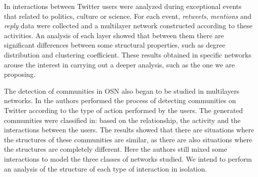 
In \cite{Omodei2015} interactions between Twitter users were analyzed during exceptional events that related to politics, culture or science. For each event, \emph{retweets}, \emph{mentions} and \emph{reply} data were collected and a multilayer network constructed according to these activities. An analysis of each layer showed that between them there are significant differences between some structural properties, such as degree distribution and clustering coefficient. These results obtained in specific networks arouse the interest in carrying out a deeper analysis, such as the one we are proposing.

The detection of communities in OSN also began to be studied in multilayers networks. In \cite{Darmon2015} the authors performed the process of detecting communities on Twitter according to the type of action performed by the users. The generated communities were classified in: based on the relationship, the activity and the interactions between the users. The results showed that there are situations where the structures of these communities are similar, as there are also situations where the structures are completely different. Here the authors still mixed some interactions to model the three classes of networks studied. We intend to perform an analysis of the structure of each type of interaction in isolation.

